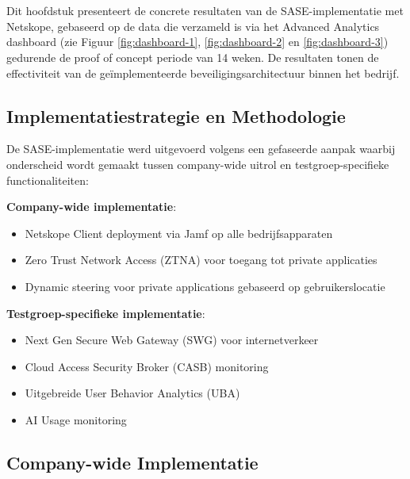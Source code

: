 
\chapter{}%
\label{ch:resultaten}

Dit hoofdstuk presenteert de concrete resultaten van de SASE-implementatie met Netskope, gebaseerd op de data die verzameld is via het Advanced Analytics dashboard (zie Figuur \ref{fig:dashboard-1}, \ref{fig:dashboard-2} en \ref{fig:dashboard-3}) gedurende de proof of concept periode van 14 weken. De resultaten tonen de effectiviteit van de geïmplementeerde beveiligingsarchitectuur binnen het bedrijf.


\section{Implementatiestrategie en Methodologie}
De SASE-implementatie werd uitgevoerd volgens een gefaseerde aanpak waarbij onderscheid wordt gemaakt tussen company-wide uitrol en testgroep-specifieke functionaliteiten:

\textbf{Company-wide implementatie}:
\begin{itemize}
    \item Netskope Client deployment via Jamf op alle bedrijfsapparaten
    \item Zero Trust Network Access (ZTNA) voor toegang tot private applicaties
    \item Dynamic steering voor private applications gebaseerd op gebruikerslocatie
\end{itemize}

\vspace{2ex}

\textbf{Testgroep-specifieke implementatie}:
\begin{itemize}
    \item Next Gen Secure Web Gateway (SWG) voor internetverkeer
    \item Cloud Access Security Broker (CASB) monitoring
    \item Uitgebreide User Behavior Analytics (UBA)
    \item AI Usage monitoring
\end{itemize}

\section{Company-wide Implementatie}
